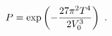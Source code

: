 \begin{equation}\label{thinnogravity}
P = \exp\left({-{27\pi^2 T^4 \over 2V_0^3}}\right)
\ .
\end{equation} 
